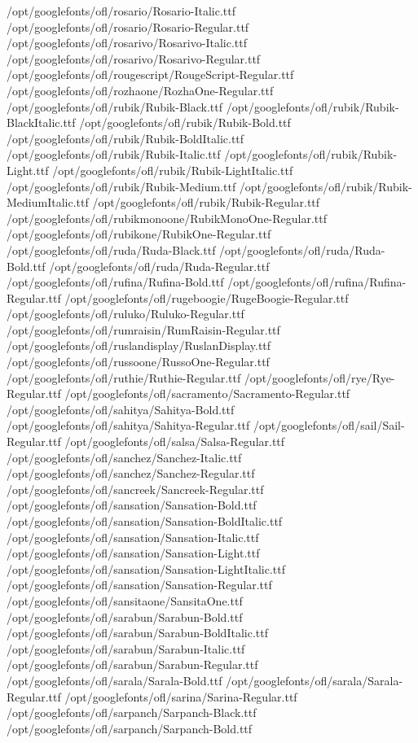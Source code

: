 /opt/googlefonts/ofl/rosario/Rosario-Italic.ttf
/opt/googlefonts/ofl/rosario/Rosario-Regular.ttf
/opt/googlefonts/ofl/rosarivo/Rosarivo-Italic.ttf
/opt/googlefonts/ofl/rosarivo/Rosarivo-Regular.ttf
/opt/googlefonts/ofl/rougescript/RougeScript-Regular.ttf
/opt/googlefonts/ofl/rozhaone/RozhaOne-Regular.ttf
/opt/googlefonts/ofl/rubik/Rubik-Black.ttf
/opt/googlefonts/ofl/rubik/Rubik-BlackItalic.ttf
/opt/googlefonts/ofl/rubik/Rubik-Bold.ttf
/opt/googlefonts/ofl/rubik/Rubik-BoldItalic.ttf
/opt/googlefonts/ofl/rubik/Rubik-Italic.ttf
/opt/googlefonts/ofl/rubik/Rubik-Light.ttf
/opt/googlefonts/ofl/rubik/Rubik-LightItalic.ttf
/opt/googlefonts/ofl/rubik/Rubik-Medium.ttf
/opt/googlefonts/ofl/rubik/Rubik-MediumItalic.ttf
/opt/googlefonts/ofl/rubik/Rubik-Regular.ttf
/opt/googlefonts/ofl/rubikmonoone/RubikMonoOne-Regular.ttf
/opt/googlefonts/ofl/rubikone/RubikOne-Regular.ttf
/opt/googlefonts/ofl/ruda/Ruda-Black.ttf
/opt/googlefonts/ofl/ruda/Ruda-Bold.ttf
/opt/googlefonts/ofl/ruda/Ruda-Regular.ttf
/opt/googlefonts/ofl/rufina/Rufina-Bold.ttf
/opt/googlefonts/ofl/rufina/Rufina-Regular.ttf
/opt/googlefonts/ofl/rugeboogie/RugeBoogie-Regular.ttf
/opt/googlefonts/ofl/ruluko/Ruluko-Regular.ttf
/opt/googlefonts/ofl/rumraisin/RumRaisin-Regular.ttf
/opt/googlefonts/ofl/ruslandisplay/RuslanDisplay.ttf
/opt/googlefonts/ofl/russoone/RussoOne-Regular.ttf
/opt/googlefonts/ofl/ruthie/Ruthie-Regular.ttf
/opt/googlefonts/ofl/rye/Rye-Regular.ttf
/opt/googlefonts/ofl/sacramento/Sacramento-Regular.ttf
/opt/googlefonts/ofl/sahitya/Sahitya-Bold.ttf
/opt/googlefonts/ofl/sahitya/Sahitya-Regular.ttf
/opt/googlefonts/ofl/sail/Sail-Regular.ttf
/opt/googlefonts/ofl/salsa/Salsa-Regular.ttf
/opt/googlefonts/ofl/sanchez/Sanchez-Italic.ttf
/opt/googlefonts/ofl/sanchez/Sanchez-Regular.ttf
/opt/googlefonts/ofl/sancreek/Sancreek-Regular.ttf
/opt/googlefonts/ofl/sansation/Sansation-Bold.ttf
/opt/googlefonts/ofl/sansation/Sansation-BoldItalic.ttf
/opt/googlefonts/ofl/sansation/Sansation-Italic.ttf
/opt/googlefonts/ofl/sansation/Sansation-Light.ttf
/opt/googlefonts/ofl/sansation/Sansation-LightItalic.ttf
/opt/googlefonts/ofl/sansation/Sansation-Regular.ttf
/opt/googlefonts/ofl/sansitaone/SansitaOne.ttf
/opt/googlefonts/ofl/sarabun/Sarabun-Bold.ttf
/opt/googlefonts/ofl/sarabun/Sarabun-BoldItalic.ttf
/opt/googlefonts/ofl/sarabun/Sarabun-Italic.ttf
/opt/googlefonts/ofl/sarabun/Sarabun-Regular.ttf
/opt/googlefonts/ofl/sarala/Sarala-Bold.ttf
/opt/googlefonts/ofl/sarala/Sarala-Regular.ttf
/opt/googlefonts/ofl/sarina/Sarina-Regular.ttf
/opt/googlefonts/ofl/sarpanch/Sarpanch-Black.ttf
/opt/googlefonts/ofl/sarpanch/Sarpanch-Bold.ttf
